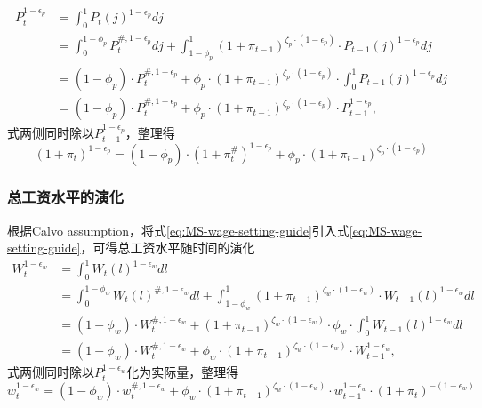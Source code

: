 \begin{equation*}
\begin{split}
P_t^{1-\epsilon_p} &= \int_0^1 P_t(j)^{1-\epsilon_p} dj \\
&= \int_0^{1-\phi_p} P_t^{\#, 1-\epsilon_p} dj + \int_{1-\phi_p}^{1} \left(1+\pi_{t-1}\right)^{\zeta_p \cdot \left(1-\epsilon_p \right)} \cdot P_{t-1}(j)^{1-\epsilon_p} dj\\
&=\left(1-\phi_p \right) \cdot P_t^{\#, 1-\epsilon_p} + \phi_p \cdot \left(1+\pi_{t-1}\right)^{\zeta_p \cdot \left(1-\epsilon_p\right)} \cdot \int_0^1 P_{t-1}(j)^{1-\epsilon_p} dj\\
&=\left(1-\phi_p \right) \cdot P_t^{\#, 1-\epsilon_p} + \phi_p \cdot \left(1+\pi_{t-1}\right)^{\zeta_p \cdot \left(1-\epsilon_p\right)} \cdot P_{t-1}^{1-\epsilon_p},
\end{split}
\end{equation*}
式两侧同时除以$P_{t-1}^{1-\epsilon_p}$，整理得
\begin{equation}
\label{eq:MS-agg-price-index-evolution}
\left(1+\pi_t\right)^{1-\epsilon_p} = \left(1-\phi_p\right) \cdot \left(1+\pi_t^{\#}\right)^{1-\epsilon_p} + \phi_p \cdot \left(1+\pi_{t-1}\right)^{\zeta_p \cdot \left(1-\epsilon_p\right)}
\end{equation}

\subsubsection{总工资水平的演化}
根据Calvo assumption\citep{Calvo:1983uq}，将式\eqref{eq:MS-wage-setting-guide}引入式\eqref{eq:MS-wage-setting-guide}，可得总工资水平随时间的演化
\begin{equation*}
\begin{split}
W_t^{1-\epsilon_w} &= \int_0^1 W_t(l)^{1-\epsilon_w} dl \\
&=\int_0^{1-\phi_w} W_t(l)^{\#, 1-\epsilon_w} dl+ \int_{1-\phi_w}^{1} \left(1+\pi_{t-1}\right)^{\zeta_w \cdot \left(1-\epsilon_w\right)} \cdot W_{t-1}(l)^{1-\epsilon_w} dl \\
&= \left(1-\phi_w \right) \cdot W_t^{\#, 1-\epsilon_w} + \left(1+\pi_{t-1}\right)^{\zeta_w \cdot \left(1-\epsilon_w\right)} \cdot \phi_w \cdot  \int_0^1 W_{t-1}(l)^{1-\epsilon_w} dl \\
&=\left(1-\phi_w \right) \cdot W_t^{\#, 1-\epsilon_w} + \phi_w \cdot \left(1+\pi_{t-1}\right)^{\zeta_w \cdot \left(1-\epsilon_w\right)} \cdot W_{t-1}^{1-\epsilon_w},
\end{split}
\end{equation*}
式两侧同时除以$P_t^{1-\epsilon_w}$化为实际量，整理得
\begin{equation}
\label{eq:MS-agg-wage-index-evolution}
w_t^{1-\epsilon_w} = \left( 1-\phi_w \right) \cdot w_t^{\#, 1-\epsilon_w} + \phi_w \cdot \left(1+\pi_{t-1}\right)^{\zeta_w \cdot \left(1-\epsilon_w\right)} \cdot w_{t-1}^{1-\epsilon_w} \cdot \left(1 + \pi_t\right)^{- \left(1 - \epsilon_w \right)}
\end{equation}

